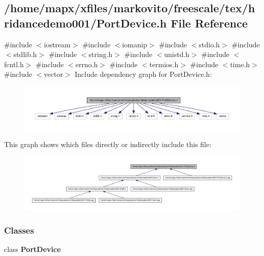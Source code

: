\subsection{/home/mapx/xfiles/markovito/freescale/tex/hridancedemo001/\-Port\-Device.h \-File \-Reference}
\label{_port_device_8h}
{\ttfamily \#include $<$iostream$>$}\*
{\ttfamily \#include $<$iomanip$>$}\*
{\ttfamily \#include $<$stdio.\-h$>$}\*
{\ttfamily \#include $<$stdlib.\-h$>$}\*
{\ttfamily \#include $<$string.\-h$>$}\*
{\ttfamily \#include $<$unistd.\-h$>$}\*
{\ttfamily \#include $<$fcntl.\-h$>$}\*
{\ttfamily \#include $<$errno.\-h$>$}\*
{\ttfamily \#include $<$termios.\-h$>$}\*
{\ttfamily \#include $<$time.\-h$>$}\*
{\ttfamily \#include $<$vector$>$}\*
\-Include dependency graph for \-Port\-Device.\-h\-:\nopagebreak
\begin{figure}[H]
\begin{center}
\leavevmode
\includegraphics[width=350pt]{_port_device_8h__incl}
\end{center}
\end{figure}
\-This graph shows which files directly or indirectly include this file\-:\nopagebreak
\begin{figure}[H]
\begin{center}
\leavevmode
\includegraphics[width=350pt]{_port_device_8h__dep__incl}
\end{center}
\end{figure}
\subsubsection*{\-Classes}
\begin{DoxyCompactItemize}
\item 
class {\bf \-Port\-Device}
\end{DoxyCompactItemize}
